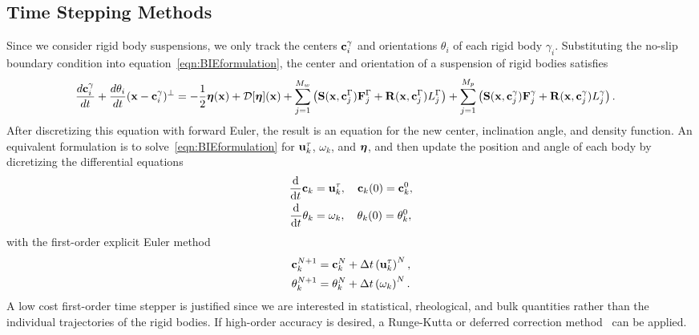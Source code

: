 \documentclass[AMA,STIX1COL]{WileyNJD-v2}
\begin{document}
\subsection{Time Stepping Methods}
\label{sec:temporal}
Since we consider rigid body suspensions, we only track the centers
${\mathbf{c}}_i^\gamma$ and orientations $\theta_i$ of each rigid body
$\gamma_i$.  Substituting the no-slip boundary condition into
equation~\eqref{eqn:BIEformulation}, the center and orientation of a
suspension of rigid bodies satisfies
\begin{align*}
  \frac{d{\mathbf{c}}_i^\gamma}{dt} + \frac{d\theta_i}{dt}
    ({\mathbf{x}} - {\mathbf{c}}_i^\gamma)^\perp &=
    -\frac{1}{2}{\boldsymbol\eta}({\mathbf{x}}) + {\mathcal{D}}[{\boldsymbol\eta}]({\mathbf{x}}) + 
    \sum_{j=1}^{M_w} \left(\mathbf{S}({\mathbf{x}},{\mathbf{c}}^\Gamma_j){\mathbf{F}}^\Gamma_j + 
      \mathbf{R}({\mathbf{x}},{\mathbf{c}}^\Gamma_j)L^\Gamma_j\right) 
    +\sum_{j=1}^{M_p} \left(\mathbf{S}({\mathbf{x}},{\mathbf{c}}^\gamma_j){\mathbf{F}}^\gamma_j +
      \mathbf{R}({\mathbf{x}},{\mathbf{c}}^\gamma_j)L^\gamma_j\right).
\end{align*}
After discretizing this equation with forward Euler, the result is an
equation for the new center, inclination angle, and density function.
An equivalent formulation is to solve~\eqref{eqn:BIEformulation} for
${\mathbf{u}}^\tau_k$, $\omega_k$, and ${\boldsymbol\eta}$, and then update the position and
angle of each body by dicretizing the differential equations
\begin{align*}
  \frac{\text{d}}{\text{d}t}{\mathbf{c}}_k &= {\mathbf{u}}^\tau_k,  
    \quad {\mathbf{c}}_k(0) = {\mathbf{c}}_k^0, \\
  \frac{\text{d}}{\text{d}t}\theta_k &= \omega_k,
    \quad \theta_k(0) = \theta_k^0,
\end{align*}
with the first-order explicit Euler method
\begin{align*}
  {\mathbf{c}}_k^{N+1} &= {\mathbf{c}}_k^N + \Delta t \left({\mathbf{u}}_k^\tau\right)^N, \\
  \theta_k^{N+1} &= \theta_k^N + \Delta t \left(\omega_k\right)^N.
\end{align*}
A low cost first-order time stepper is justified since we are interested
in statistical, rheological, and bulk quantities rather than the
individual trajectories of the rigid bodies.  If high-order accuracy is
desired, a Runge-Kutta or deferred correction method~\cite{Quaife2015,
qua-bir2016} can be applied.
\end{document}
